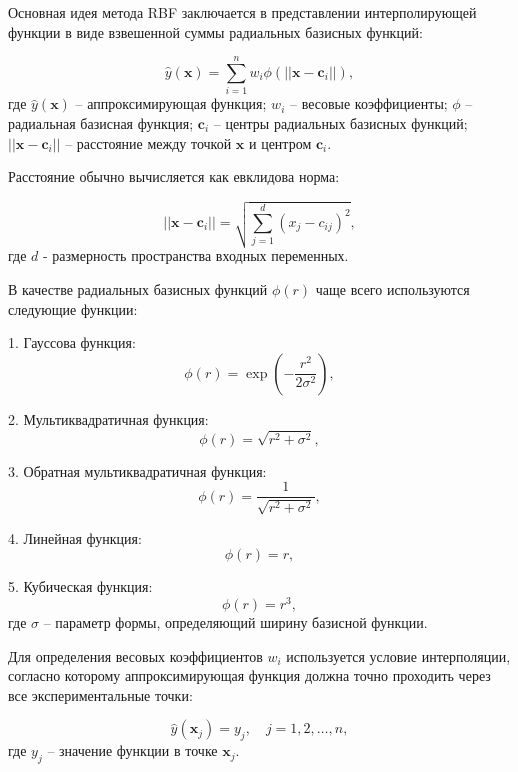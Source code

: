 Основная идея метода RBF заключается в представлении интерполирующей функции в виде взвешенной суммы радиальных базисных функций:

\begin{equation}
\hat{y}(\mathbf{x}) = \sum_{i=1}^{n} w_i \phi(||\mathbf{x} - \mathbf{c}_i||),
\end{equation}
где $\hat{y}(\mathbf{x})$ -- аппроксимирующая функция;
$w_i$ -- весовые коэффициенты;
$\phi$ -- радиальная базисная функция;
$\mathbf{c}_i$ -- центры радиальных базисных функций;
$||\mathbf{x} - \mathbf{c}_i||$ -- расстояние между точкой $\mathbf{x}$ и центром $\mathbf{c}_i$.

Расстояние обычно вычисляется как евклидова норма:

\begin{equation}
||\mathbf{x} - \mathbf{c}_i|| = \sqrt{\sum_{j=1}^{d} (x_j - c_{ij})^2},
\end{equation}
где $d$ - размерность пространства входных переменных.

В качестве радиальных базисных функций $\phi(r)$ чаще всего используются следующие функции:

1. Гауссова функция:
\begin{equation}
\phi(r) = \exp\left(-\frac{r^2}{2\sigma^2}\right),
\end{equation}

2. Мультиквадратичная функция:
\begin{equation}
\phi(r) = \sqrt{r^2 + \sigma^2},
\end{equation}

3. Обратная мультиквадратичная функция:
\begin{equation}
\phi(r) = \frac{1}{\sqrt{r^2 + \sigma^2}},
\end{equation}

4. Линейная функция:
\begin{equation}
\phi(r) = r,
\end{equation}

5. Кубическая функция:
\begin{equation}
\phi(r) = r^3,
\end{equation}
где $\sigma$ -- параметр формы, определяющий ширину базисной функции.

Для определения весовых коэффициентов $w_i$ используется условие интерполяции,
согласно которому аппроксимирующая функция должна точно проходить через все экспериментальные точки:

\begin{equation}
\hat{y}(\mathbf{x}_j) = y_j, \quad j = 1, 2, \ldots, n,
\end{equation}
где $y_j$ -- значение функции в точке $\mathbf{x}_j$.

